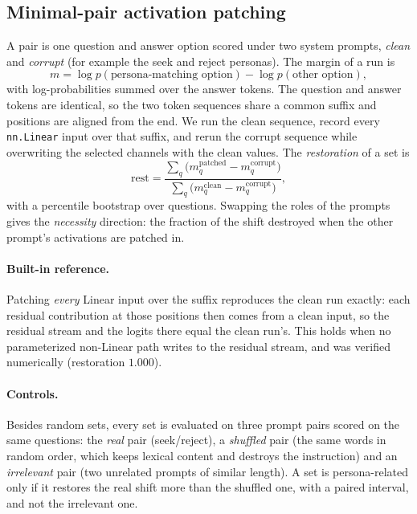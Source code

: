 \documentclass[11pt]{article}
\newcommand{\code}[1]{\texttt{#1}}
\begin{document}
\subsection{Minimal-pair activation patching}
A pair is one question and answer option scored under two system prompts, \emph{clean} and \emph{corrupt} (for example the seek
and reject personas). The margin of a run is
\begin{equation}
m=\log p(\text{persona-matching option})-\log p(\text{other option}),
\end{equation}
with log-probabilities summed over the answer tokens. The question and answer tokens are identical, so the two token
sequences share a common suffix and positions are aligned from the end. We run the clean sequence, record every
\code{nn.Linear} input over that suffix, and rerun the corrupt sequence while overwriting the selected channels with the clean values.
The \emph{restoration} of a set is
\begin{equation}
\mathrm{rest}=\frac{\sum_q\bigl(m^{\text{patched}}_q-m^{\text{corrupt}}_q\bigr)}{\sum_q\bigl(m^{\text{clean}}_q-m^{\text{corrupt}}_q\bigr)},
\end{equation}
with a percentile bootstrap over questions. Swapping the roles of the prompts gives the \emph{necessity} direction: the fraction
of the shift destroyed when the other prompt's activations are patched in.

\paragraph{Built-in reference.}
Patching \emph{every} Linear input over the suffix reproduces the clean run exactly: each residual contribution at those positions
then comes from a clean input, so the residual stream and the logits there equal the clean run's. This holds when no parameterized
non-Linear path writes to the residual stream, and was verified numerically (restoration $1.000$).

\paragraph{Controls.}
Besides random sets, every set is evaluated on three prompt pairs scored on the same questions: the \emph{real} pair (seek/reject),
a \emph{shuffled} pair (the same words in random order, which keeps lexical content and destroys the instruction) and an
\emph{irrelevant} pair (two unrelated prompts of similar length). A set is persona-related only if it restores the real
shift more than the shuffled one, with a paired interval, and not the irrelevant one.
\end{document}
